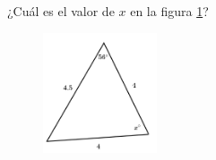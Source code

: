 \question[15]  ¿Cuál es el valor de $x$ en la figura \ref{fig:findangle06}?
\begin{figure}[H]
    \begin{center}
        \includegraphics[width=0.3\textwidth]{../images/findangle06.png}
    \end{center}
    \caption{}
    \label{fig:findangle06}
\end{figure}